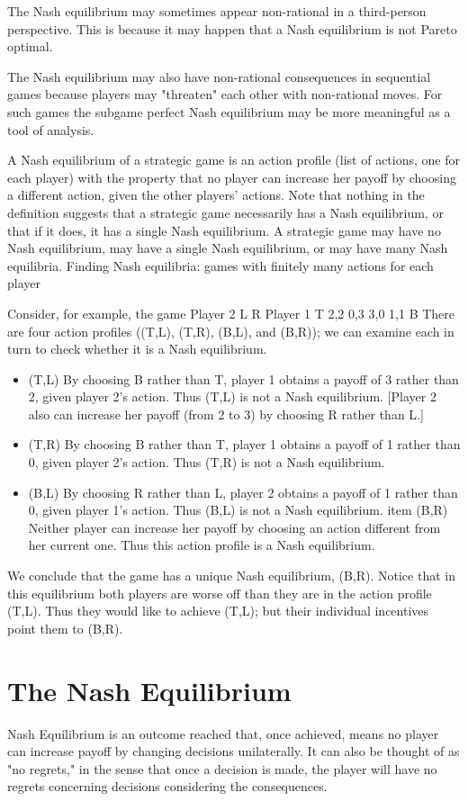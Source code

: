 \documentclass[a4paper,12pt]{article}
\begin{document}
The Nash equilibrium may sometimes appear non-rational in a third-person perspective. This is because it may happen that a Nash equilibrium is not Pareto optimal.

The Nash equilibrium may also have non-rational consequences in sequential games because players may "threaten" each other with non-rational moves. For such games the subgame perfect Nash equilibrium may be more meaningful as a tool of analysis.

\newpage
A Nash equilibrium of a strategic game is an action profile (list of actions, one for each player) with the property that no player can increase her payoff by choosing a different action, given the other players' actions.
Note that nothing in the definition suggests that a strategic game necessarily has a Nash equilibrium, or that if it does, it has a single Nash equilibrium. A strategic game may have no Nash equilibrium, may have a single Nash equilibrium, or may have many Nash equilibria.
Finding Nash equilibria: games with finitely many actions for each player

Consider, for example, the game
Player 2
L	R
Player 1	T	
2,2	0,3
3,0	1,1
B
There are four action profiles ((T,L), (T,R), (B,L), and (B,R)); we can examine each in turn to check whether it is a Nash equilibrium.
\begin{itemize}
\item (T,L)
By choosing B rather than T, player 1 obtains a payoff of 3 rather than 2, given player 2's action. Thus (T,L) is not a Nash equilibrium. [Player 2 also can increase her payoff (from 2 to 3) by choosing R rather than L.]
\item (T,R)
By choosing B rather than T, player 1 obtains a payoff of 1 rather than 0, given player 2's action. Thus (T,R) is not a Nash equilibrium.
\item (B,L)
By choosing R rather than L, player 2 obtains a payoff of 1 rather than 0, given player 1's action. Thus (B,L) is not a Nash equilibrium.
item (B,R)
Neither player can increase her payoff by choosing an action different from her current one. Thus this action profile is a Nash equilibrium.
\end{itemize}
We conclude that the game has a unique Nash equilibrium, (B,R).
Notice that in this equilibrium both players are worse off than they are in the action profile (T,L). Thus they would like to achieve (T,L); but their individual incentives point them to (B,R).
\newpage
\section{The Nash Equilibrium}
Nash Equilibrium is an outcome reached that, once achieved, means no player can increase payoff by changing decisions unilaterally. It can also be thought of as "no regrets," in the sense that once a decision is made, the player will have no regrets concerning decisions considering the consequences.
\end{document}
